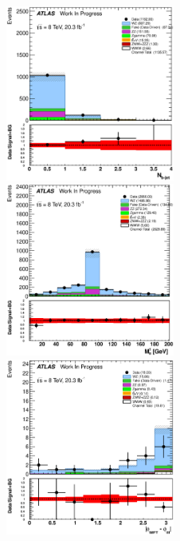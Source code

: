 \begin{figure}[ht!]
\centering
\includegraphics[width=0.495\textwidth]{figures/appendix_signal_selection/Nov24Update_FakeSys_KFacSys_LinearY_Rebin/output/jobs/MxM/DataFull_Rates_May13_FakeRatesExactly2Loose_MuonMxMBJetGt0_ElBJetGt0SubtractPC_MxM/PreselectionNov23_15_2SFOS_ChargeAbs1_physics/weight_all/eps/NBTaggedJets_histratio.eps}
\includegraphics[width=0.495\textwidth]{figures/appendix_signal_selection/Nov24Update_FakeSys_KFacSys_LinearY_Rebin/output/jobs/MxM/DataFull_Rates_May13_FakeRatesExactly2Loose_MuonMxMBJetGt0_ElBJetGt0SubtractPC_MxM/PreselectionNov23_15_2SFOS_ChargeAbs1_BVeto85_physics/weight_all/eps/InvariantMassSFOS_histratio.eps}
\includegraphics[width=0.495\textwidth]{figures/appendix_signal_selection/Nov24Update_FakeSys_KFacSys_LinearY_Rebin/output/jobs/MxM/DataFull_Rates_May13_FakeRatesExactly2Loose_MuonMxMBJetGt0_ElBJetGt0SubtractPC_MxM/PreselectionNov23_15_2SFOS_ChargeAbs1_BVeto85_ZVeto20GeV_METGt55GeV_physics/weight_all/eps/DeltaPhiMET123_Abs_histratio.eps}

\end{figure}
